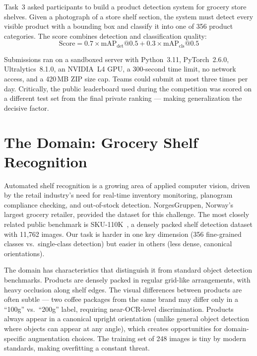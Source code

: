 \documentclass[11pt,a4paper]{article}
\begin{document}
Task~3 asked participants to build a product detection system for grocery store shelves.
Given a photograph of a store shelf section, the system must detect every visible product with a bounding box and classify it into one of 356 product categories.
The score combines detection and classification quality:
\begin{equation}
    \text{Score} = 0.7 \times \text{mAP}_{\text{det}}@0.5 + 0.3 \times \text{mAP}_{\text{cls}}@0.5
    \label{eq:score}
\end{equation}

Submissions ran on a sandboxed server with Python~3.11, PyTorch~2.6.0, Ultralytics~8.1.0, an NVIDIA~L4 GPU, a 300-second time limit, no network access, and a 420\,MB ZIP size cap.
Teams could submit at most three times per day.
Critically, the public leaderboard used during the competition was scored on a different test set from the final private ranking --- making generalization the decisive factor.

\section{The Domain: Grocery Shelf Recognition}
\label{sec:domain}

Automated shelf recognition is a growing area of applied computer vision, driven by the retail industry's need for real-time inventory monitoring, planogram compliance checking, and out-of-stock detection.
NorgesGruppen, Norway's largest grocery retailer, provided the dataset for this challenge.
The most closely related public benchmark is SKU-110K~\cite{goldman2019sku110k}, a densely packed shelf detection dataset with 11,762 images.
Our task is harder in one key dimension (356 fine-grained classes vs.\ single-class detection) but easier in others (less dense, canonical orientations).

The domain has characteristics that distinguish it from standard object detection benchmarks.
Products are densely packed in regular grid-like arrangements, with heavy occlusion along shelf edges.
The visual differences between products are often subtle --- two coffee packages from the same brand may differ only in a ``100g'' vs.\ ``200g'' label, requiring near-OCR-level discrimination.
Products always appear in a canonical upright orientation (unlike general object detection where objects can appear at any angle), which creates opportunities for domain-specific augmentation choices.
The training set of 248 images is tiny by modern standards, making overfitting a constant threat.
\end{document}
